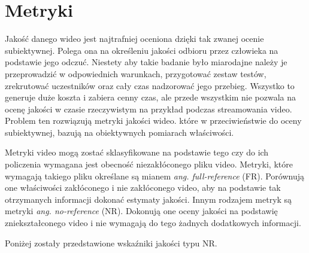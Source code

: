 \section{Metryki}

Jakość danego wideo jest najtrafniej oceniona dzięki tak zwanej ocenie subiektywnej. Polega ona na określeniu jakości odbioru przez człowieka na podstawie jego odczuć. Niestety aby takie badanie było miarodajne należy je przeprowadzić w odpowiednich warunkach, przygotować zestaw testów, zrekrutować uczestników oraz cały czas nadzorować jego przebieg. Wszystko to generuje duże koszta i zabiera cenny czas, ale przede wszystkim nie pozwala na ocenę jakości w czasie rzeczywistym na przykład podczas streamowania video. Problem ten rozwiązują metryki jakości wideo. które w przeciwieństwie do oceny subiektywnej, bazują na obiektywnych pomiarach właściwości\cite{vqm}.\par
Metryki video mogą zostać sklasyfikowane na podstawie tego czy do ich policzenia wymagana jest obecność niezakłóconego pliku video. Metryki, które wymagają takiego pliku określane są mianem {\em ang. full-reference} (FR). Porównują one właściwości zakłóconego i nie zakłóconego video, aby na podstawie tak otrzymanych informacji dokonać estymaty jakości. Innym rodzajem metryk są metryki {\em ang. no-reference} (NR). Dokonują one oceny jakości na podstawię zniekształconego video i nie wymagają do tego żadnych dodatkowych informacji\cite{vqm}.\par

Poniżej zostały przedstawione wskaźniki jakości typu NR.

